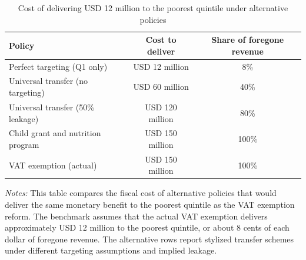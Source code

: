 \begin{table}[!htbp]
\centering
\caption{Cost of delivering USD 12 million to the poorest quintile under alternative policies}
\label{tab:alternative_policies}
\begin{tabular}{lcc}
\toprule
Policy & Cost to deliver & Share of foregone revenue \\
\midrule
Perfect targeting (Q1 only) & USD 12 million & 8\% \\
Universal transfer (no targeting) & USD 60 million & 40\% \\
Universal transfer (50\% leakage) & USD 120 million & 80\% \\
Child grant and nutrition program & USD 150 million & 100\% \\
VAT exemption (actual) & USD 150 million & 100\% \\
\bottomrule
\end{tabular}
\vspace{0.3em}
\begin{minipage}{0.86\linewidth}
\footnotesize \textit{Notes:} This table compares the fiscal cost of alternative policies that would deliver the same monetary benefit to the poorest quintile as the VAT exemption reform. The benchmark assumes that the actual VAT exemption delivers approximately USD 12 million to the poorest quintile, or about 8 cents of each dollar of foregone revenue. The alternative rows report stylized transfer schemes under different targeting assumptions and implied leakage.
\end{minipage}
\end{table}
